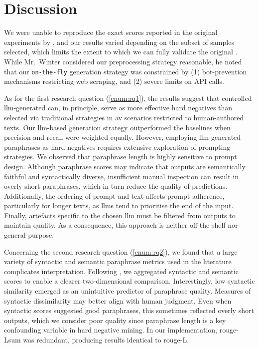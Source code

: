 \chapter{Discussion}
\label{chap:discussion}

We were unable to reproduce the exact scores reported in the original experiments by \citet{koppel_determining_2014}, and our results varied depending on the subset of samples selected, 
which limits the extent to which we can fully validate the original \impAppr{}. 
While Mr.\ Winter considered our preprocessing strategy reasonable, he noted that our \texttt{on-the-fly} \imp{} generation strategy was constrained by (1) bot-prevention mechanisms restricting web scraping, and (2) severe limits on API calls.  

As for the first research question (\ref{enum:rq1}), the results suggest that controlled \ac{llm}-generated \imps{} can, in principle, serve as more effective hard negatives than \imps{} selected via traditional strategies in \ac{av} scenarios restricted to human-authored texts. 
Our \ac{llm}-based \imp{} generation strategy outperformed the baselines when precision and recall were weighted equally.  
However, employing \ac{llm}-generated paraphrases as hard negatives requires extensive exploration of prompting strategies.  
We observed that paraphrase length is highly sensitive to prompt design. 
Although paraphrase scores may indicate that outputs are semantically faithful and syntactically diverse, insufficient manual inspection can result in overly short paraphrases, which in turn reduce the quality of predictions.  
Additionally, the ordering of prompt and text affects prompt adherence, particularly for longer texts, as \acp{llm} tend to prioritise the end of the input.  
Finally, artefacts specific to the chosen \ac{llm} must be filtered from outputs to maintain quality. 
As a consequence, this approach is neither off-the-shelf nor general-purpose. 

Concerning the second research question (\ref{enum:rq2}), we found that a large variety of syntactic and semantic paraphrase metrics used in the literature complicates interpretation. 
Following \citet{gohsen_captions_2023}, we aggregated syntactic and semantic scores to enable a clearer two-dimensional comparison.  
Interestingly, low syntactic similarity emerged as an unintuitive predictor of paraphrase quality. 
Measures of syntactic dissimilarity may better align with human judgment.  
Even when syntactic scores suggested good paraphrases, this sometimes reflected overly short outputs, which we consider poor quality since paraphrase length is a key confounding variable in hard negative mining.  
In our implementation, \ac{rouge}-Lsum was redundant, producing results identical to \ac{rouge}-L.  

